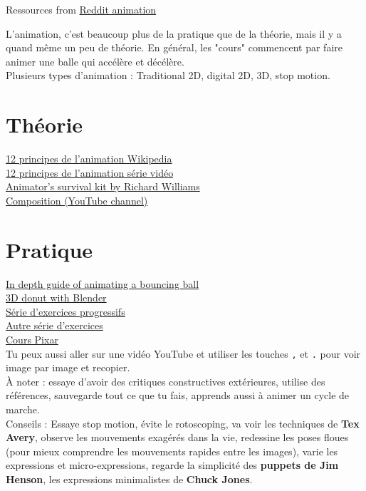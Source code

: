 \documentclass[12pt]{article}
\begin{document}
Ressources from \href{https://www.reddit.com/r/animation/}{Reddit animation}

L'animation, c'est beaucoup plus de la pratique que de la théorie, mais il y
a quand même un peu de théorie. En général, les "cours" commencent par faire
animer une balle qui accélère et décélère.\\
Plusieurs types d'animation : Traditional 2D, digital 2D, 3D, stop motion. \\

\section*{Théorie}
\href{https://en.wikipedia.org/wiki/Twelve_basic_principles_of_animation#Squash_and_stretch}{12 principes de l'animation Wikipedia}\\
\href{https://www.youtube.com/watch?v=uDqjIdI4bF4}{12 principes de l'animation série vidéo}\\
\href{https://www.amazon.com/Animators-Survival-Kit-Richard-Williams/dp/0571202284}{Animator's survival kit by Richard Williams}\\
\href{https://www.youtube.com/watch?v=MPRAH7AKMWw}{Composition (YouTube channel)}\\
\section*{Pratique}
\href{http://www.angryanimator.com/word/2010/11/26/animation-tutorial-1-bouncing-ball/:w}{In depth guide of animating a bouncing ball}\\
\href{https://www.youtube.com/watch?v=B0J27sf9N1Y&list=PLjEaoINr3zgEPv5y--4MKpciLaoQYZB1Z&pp=iAQB donut}{3D donut with Blender}\\
\href{https://thinkinganimation.com/animation-exercises/#1505506796027-3-4}{Série d'exercices progressifs}\\
\href{https://www.animatorisland.com/51-great-animation-exercises-to-master/}{Autre série d'exercices}\\
\href{https://www.khanacademy.org/computing/pixar}{Cours Pixar}\\
Tu peux aussi aller sur une vidéo YouTube et utiliser les touches \texttt{,} et \texttt{.} pour
voir image par image et recopier.\\
À noter : essaye d'avoir des critiques constructives extérieures, utilise des références,
sauvegarde tout ce que tu fais, apprends aussi à animer un cycle de marche.\\
Conseils : Essaye stop motion, évite le rotoscoping, va voir les techniques de \textbf{Tex Avery},
observe les mouvements exagérés dans la vie, redessine les poses floues (pour mieux comprendre les mouvements
rapides entre les images), varie les expressions et micro-expressions, regarde la simplicité des
\textbf{puppets de Jim Henson}, les expressions minimalistes de \textbf{Chuck Jones}.
\end{document}
